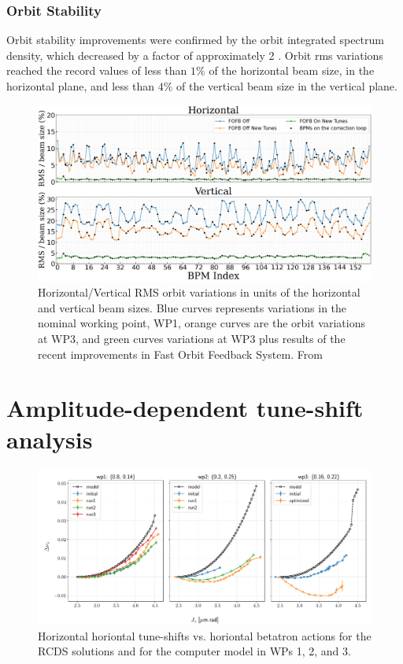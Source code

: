 \subsubsection{Orbit Stability}
Orbit stability improvements were confirmed by the orbit integrated spectrum density, which decreased by a factor of approximately 2 \cite{Liu:IPAC23-WEOGA2}. Orbit rms variations reached the record values of less than $1\%$ of the horizontal beam size, in the horizontal plane, and less than $4\%$ of the vertical beam size in the vertical plane.


\begin{figure}[tb]
    \centering
    \includegraphics[width=\textwidth]{Images/WEOGA2_f5.png}
    \caption{Horizontal/Vertical RMS orbit variations in units of the horizontal and vertical beam sizes. Blue curves represents variations in the nominal working point, WP1, orange curves are the orbit variations at WP3, and green curves variations at WP3 plus results of the recent improvements in Fast Orbit Feedback System. From~\cite{Liu:IPAC23-WEOGA2}}
\end{figure}

\section{Amplitude-dependent tune-shift analysis}
\begin{figure}
    \includegraphics[width=\columnwidth]{Images/opt_configs_dtunes.pdf}
    \caption{Horizontal horiontal tune-shifts vs. horiontal betatron actions for the RCDS solutions and for the computer model in WPs 1, 2, and 3.}
\end{figure}
